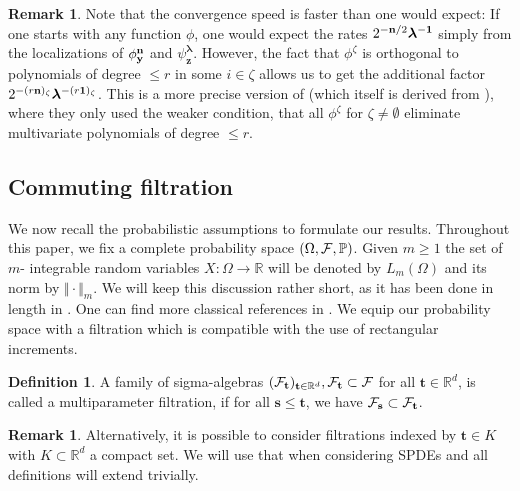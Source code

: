 \documentclass[12pt]{article}
\numberwithin{equation}{section}
\theoremstyle{plain}
\theoremstyle{definition}
\newtheorem{definition}[theorem]{Definition}
\newtheorem{remark}[theorem]{Remark}
\newcommand{\R}{\ensuremath{{\mathbb R}}}
\def\bR{\mathbb{R}}\def\bS{\mathbb{S}}
\def\bP{\mathbb{P}}\def\bU{\mathbb{U}}
\def\fs{\mathbf s}\def\ft{\mathbf t}
\def\fy{\mathbf y}\def\fz{\mathbf z}
\def\flambda{{\boldsymbol\lambda}}
\def\fone{{\boldsymbol 1}}
\begin{document}
\begin{remark}
Note that the convergence speed is faster than one would expect: If one starts with any function $\phi$, one would expect the rates $2^{-\fn/2}\flambda^{-\fone}$ simply from the localizations of $\phi^\fn_\fy$ and $\psi^\flambda_\fz$. However, the fact that $\phi^\zeta$ is orthogonal to polynomials of degree $\le r$ in some $i\in\zeta$ allows us to get the additional factor $2^{-(r\fn)_{\zeta}}\flambda^{-(r\mathbf{1})_\zeta}$. This is a more precise version of \cite[Lemma 61]{kern2021} (which itself is derived from \cite[Proposition 3.20]{Hairer2014}), where they only used the weaker condition, that all $\phi^\zeta$ for $\zeta\neq\emptyset$ eliminate multivariate polynomials of degree $\le r$.
\end{remark}

\subsection{Commuting filtration}
We now recall the probabilistic assumptions to formulate our  results. Throughout this paper, we fix a complete probability space $(\Omega,\cF,\bP)$. Given $m\geq 1$ the set  of $m$- integrable random variables $X\colon \Omega\to \R$ will be denoted by $L_m(\Omega)$ and its norm by $\Vert \cdot \Vert_m $. We will keep this discussion rather short, as it has been done in length in \cite{multiparameterStochSewing}. One can find more classical references in \cite{Imkeller85,walsh1986,Khoshnevisan02}. We equip our probability space with a filtration which is compatible with the use of rectangular increments. 

\begin{definition}
    A family of sigma-algebras $(\cF_\ft)_{\ft\in\R^d}, \cF_\ft\subset\cF$ for all $\ft\in\bR^d$, is called a multiparameter filtration, if for all $\fs\le\ft$, we have $\cF_\fs\subset\cF_\ft$.
\end{definition}
\begin{remark}
    Alternatively, it is possible to consider filtrations indexed by $\ft\in K$ with $K\subset \R^d$ a compact set. We will use that when considering SPDEs and all definitions will extend trivially.
\end{remark}
 
\end{document}
